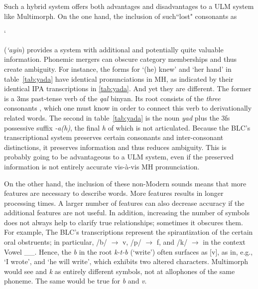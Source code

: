 Such a hybrid system offers both advantages and disadvantages to a 
\ac{ULM} system like Multimorph. 
On the one hand, the inclusion of such``lost" consonants as 
\begin{cjhebrew}`\end{cjhebrew} 
(\textit{`ayin}) provides a system with additional and potentially 
quite valuable information. 
Phonemic mergers can obscure category memberships and thus 
create ambiguity. For instance, 
the forms for `(he) knew' and `her hand' in  table~\ref{tab:yada}
have identical pronunciations in \ac{MH}, as indicated 
by their identical \ac{IPA} transcriptions
in \ref{tab:yada}. And yet they are different. 
The former is a 3ms past-tense verb of the 
\emph{qal} binyan. Its root consists of the \emph{three}
consonants \textit{}, which one must 
know in order 
to connect this verb to derivationally related words. 
The second \textipa{[yad\`{a}]} 
in table~\ref{tab:yada} is the noun \textit{yad} plus 
the 3fs possessive suffix 
\textit{-a(h)}, the final \emph{h} of which is not articulated. 
Because the \ac{BLC}'s transcriptional system preserves 
certain consonants and 
inter-consonant distinctions, it preserves information and 
thus reduces ambiguity. 
This is probably going to be advantageous to a \ac{ULM} 
system, even if the preserved 
information is not entirely accurate vis-\`{a}-vis \ac{MH} 
pronunciation.

On the other hand, the inclusion of these non-Modern 
sounds means that more features are necessary to describe 
words. More features results in longer processing times. 
A larger number of features can also decrease accuracy 
if the additional features are not useful. 
In addition, increasing the number of symbols does not 
always help to clarify true relationships; sometimes it 
obscures them. For example, The BLC's transcriptions 
represent the spirantization of the certain oral obstruents; 
in particular, /b/ $\to$ v, /p/ $\to$ f, and /k/ $\to$  
in the context
Vowel \_\_. Hence, the \textit{b} in the root \textit{k-t-b} 
(`write') often surfaces as [v], as in, e.g.,  
`I wrote', and 
 `he will write', which exhibits 
two altered characters. Multimorph would see \textit{} 
and \textit{k} as 
entirely different symbols, not at allophones
of the same phoneme. The same would be true for \textit{b} 
and \textit{v}.  


